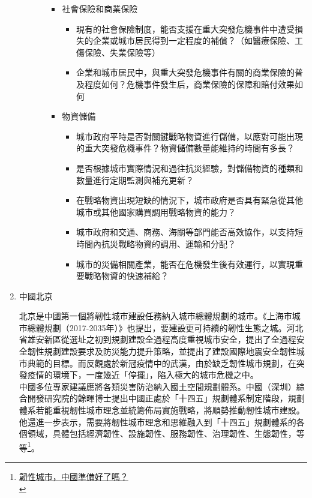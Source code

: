 \documentclass[a4paper,12pt]{article}
\begin{document}
\begin{enumerate}
\begin{enumerate}
\begin{enumerate}
\begin{itemize}
\begin{itemize}
\end{itemize}
\item 社會保險和商業保險
\label{sec:orgf931da2}
\begin{itemize}
\item 現有的社會保險制度，能否支援在重大突發危機事件中遭受損失的企業或城市居民得到一定程度的補償？（如醫療保險、工傷保險、失業保險等）\\
\item 企業和城市居民中，與重大突發危機事件有關的商業保險的普及程度如何？危機事件發生后，商業保險的保障和賠付效果如何\\
\end{itemize}
\item 物資儲備
\label{sec:org648eb11}
\begin{itemize}
\item 城市政府平時是否對關鍵戰略物資進行儲備，以應對可能出現的重大突發危機事件？物資儲備數量能維持的時間有多長？\\
\item 是否根據城市實際情況和過往抗災經驗，對儲備物資的種類和數量進行定期監測與補充更新？\\
\item 在戰略物資出現短缺的情況下，城市政府是否具有緊急從其他城市或其他國家購買調用戰略物資的能力？\\
\item 城市政府和交通、商務、海關等部門能否高效協作，以支持短時間內抗災戰略物資的調用、運輸和分配？\\
\item 城市的災備相關產業，能否在危機發生後有效運行，以實現重要戰略物資的快速補給？\\
\end{itemize}
\end{itemize}
\end{enumerate}
\end{enumerate}

\item 中國北京
\label{sec:org722fffa}

北京是中國第一個將韌性城市建設任務納入城市總體規劃的城市。《上海市城市總體規劃（2017-2035年）》也提出，要建設更可持續的韌性生態之城。河北省雄安新區從選址之初到規劃建設全過程高度重視城市安全，提出了全過程安全韌性規劃建設要求及防災能力提升策略，並提出了建設國際地震安全韌性城市典範的目標。而反觀處於新冠疫情中的武漢，由於缺乏韌性城市規劃，在突發疫情的環境下，一度幾近「停擺」，陷入極大的城市危機之中。\\

中國多位專家建議應將各類災害防治納入國土空間規劃體系。中國（深圳）綜合開發研究院的餘暉博士提出中國正處於「十四五」規劃體系制定階段，規劃體系若能重視韌性城市理念並統籌佈局實施戰略，將順勢推動韌性城市建設。他還進一步表示，需要將韌性城市理念和思維融入到「十四五」規劃體系的各個領域，具體包括經濟韌性、設施韌性、服務韌性、治理韌性、生態韌性，等等\footnote{\href{http://chla.com.cn/htm/2020/0317/274871.html}{韌性城市，中國準備好了嗎？}\\}。\\


\end{enumerate}
\end{document}
